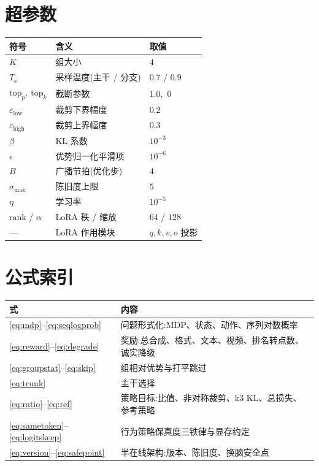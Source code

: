 \documentclass[UTF8, 11pt]{ctexart}
\begin{document}
\section{超参数}

\begin{tabular}{lll}
\hline
符号 & 含义 & 取值 \\
\hline
$K$ & 组大小 & $4$ \\
$T_{\text{s}}$ & 采样温度(主干 / 分支) & $0.7$ / $0.9$ \\
$\text{top}_p,\ \text{top}_k$ & 截断参数 & $1.0$,\ $0$ \\
$\varepsilon_{\text{low}}$ & 裁剪下界幅度 & $0.2$ \\
$\varepsilon_{\text{high}}$ & 裁剪上界幅度 & $0.3$ \\
$\beta$ & KL 系数 & $10^{-3}$ \\
$\epsilon$ & 优势归一化平滑项 & $10^{-6}$ \\
$B$ & 广播节拍(优化步) & $4$ \\
$\sigma_{\max}$ & 陈旧度上限 & $5$ \\
$\eta$ & 学习率 & $10^{-5}$ \\
$\text{rank}$ / $\alpha$ & LoRA 秩 / 缩放 & $64$ / $128$ \\
--- & LoRA 作用模块 & $q,k,v,o$ 投影 \\
\hline
\end{tabular}

\section{公式索引}

\begin{tabular}{ll}
\hline
式 & 内容 \\
\hline
\eqref{eq:mdp}--\eqref{eq:seqlogprob} & 问题形式化:MDP、状态、动作、序列对数概率 \\
\eqref{eq:reward}--\eqref{eq:degrade} & 奖励:总合成、格式、文本、视频、排名转点数、诚实降级 \\
\eqref{eq:groupstat}--\eqref{eq:skip} & 组相对优势与打平跳过 \\
\eqref{eq:trunk} & 主干选择 \\
\eqref{eq:ratio}--\eqref{eq:ref} & 策略目标:比值、非对称裁剪、k3 KL、总损失、参考策略 \\
\eqref{eq:sametoken}--\eqref{eq:logitskeep} & 行为策略保真度三铁律与显存约定 \\
\eqref{eq:version}--\eqref{eq:safepoint} & 半在线架构:版本、陈旧度、换脑安全点 \\
\hline
\end{tabular}
\end{document}
